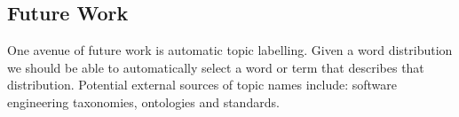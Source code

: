 \documentclass[times, 10pt,twocolumn]{article}
\newcommand{\shrinkit}{\vspace*{-.3em}}
\begin{document}
\shrinkit
\subsection{ Future Work}
\shrinkit

One avenue of future work is automatic topic labelling. Given a word
distribution we should be able to automatically select a word or term
that describes that distribution. Potential external sources of topic
names include: software engineering taxonomies, ontologies and
standards.


\shrinkit



%


\end{document}
